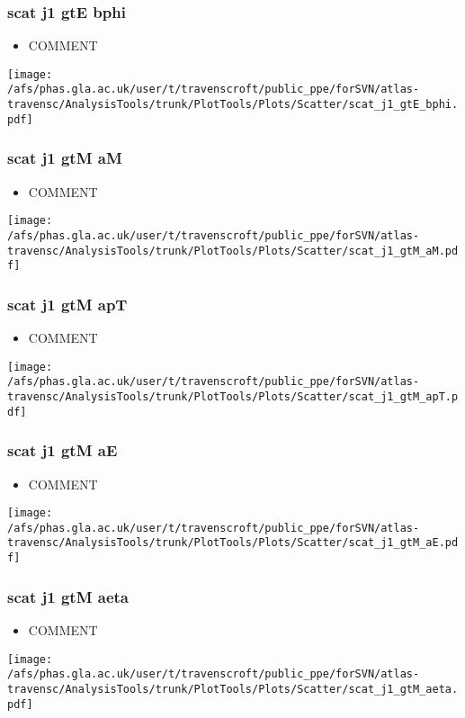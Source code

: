\documentclass{beamer}
\begin{document}
\begin{frame}
\frametitle{scat j1 gtE bphi}
\begin{itemize}
\item COMMENT
\end{itemize}
\begin{center}
\texttt{[image: /afs/phas.gla.ac.uk/user/t/travenscroft/public\_ppe/forSVN/atlas-travensc/AnalysisTools/trunk/PlotTools/Plots/Scatter/scat\_j1\_gtE\_bphi.pdf]}
\end{center}
\end{frame}

\begin{frame}
\frametitle{scat j1 gtM aM}
\begin{itemize}
\item COMMENT
\end{itemize}
\begin{center}
\texttt{[image: /afs/phas.gla.ac.uk/user/t/travenscroft/public\_ppe/forSVN/atlas-travensc/AnalysisTools/trunk/PlotTools/Plots/Scatter/scat\_j1\_gtM\_aM.pdf]}
\end{center}
\end{frame}

\begin{frame}
\frametitle{scat j1 gtM apT}
\begin{itemize}
\item COMMENT
\end{itemize}
\begin{center}
\texttt{[image: /afs/phas.gla.ac.uk/user/t/travenscroft/public\_ppe/forSVN/atlas-travensc/AnalysisTools/trunk/PlotTools/Plots/Scatter/scat\_j1\_gtM\_apT.pdf]}
\end{center}
\end{frame}

\begin{frame}
\frametitle{scat j1 gtM aE}
\begin{itemize}
\item COMMENT
\end{itemize}
\begin{center}
\texttt{[image: /afs/phas.gla.ac.uk/user/t/travenscroft/public\_ppe/forSVN/atlas-travensc/AnalysisTools/trunk/PlotTools/Plots/Scatter/scat\_j1\_gtM\_aE.pdf]}
\end{center}
\end{frame}

\begin{frame}
\frametitle{scat j1 gtM aeta}
\begin{itemize}
\item COMMENT
\end{itemize}
\begin{center}
\texttt{[image: /afs/phas.gla.ac.uk/user/t/travenscroft/public\_ppe/forSVN/atlas-travensc/AnalysisTools/trunk/PlotTools/Plots/Scatter/scat\_j1\_gtM\_aeta.pdf]}
\end{center}
\end{frame}
\end{document}
